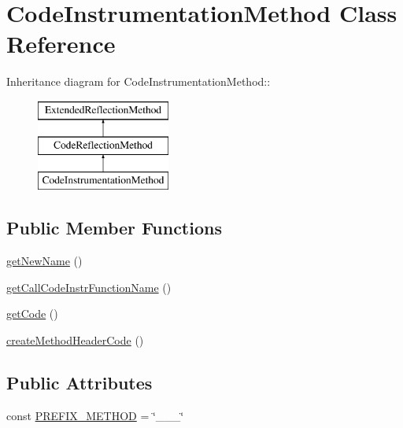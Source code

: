 \hypertarget{class_code_instrumentation_method}{
\section{CodeInstrumentationMethod Class Reference}
\label{class_code_instrumentation_method}
}
Inheritance diagram for CodeInstrumentationMethod::\begin{figure}[H]
\begin{center}
\leavevmode
\includegraphics[height=3cm]{class_code_instrumentation_method}
\end{center}
\end{figure}
\subsection*{Public Member Functions}
\begin{CompactItemize}
\item 
\hyperlink{class_code_instrumentation_method_6e2855870a7381176413aa24a2fbfd43}{getNewName} ()
\item 
\hyperlink{class_code_instrumentation_method_7f82d49e30da995729069ae9190555da}{getCallCodeInstrFunctionName} ()
\item 
\hyperlink{class_code_instrumentation_method_b5e24da53b4a0d0848b18c1e832f47ff}{getCode} ()
\item 
\hyperlink{class_code_instrumentation_method_3d517292204047acfc6bb54cc09a38e3}{createMethodHeaderCode} ()
\end{CompactItemize}
\subsection*{Public Attributes}
\begin{CompactItemize}
\item 
const \hyperlink{class_code_instrumentation_method_459af7451a2f181e2e91e444c5a72d04}{PREFIX\_\-METHOD} = \char`\"{}\_\-\_\-\_\-\char`\"{}
\end{CompactItemize}
